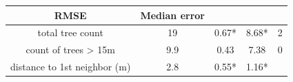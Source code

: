 \documentclass[twoside,12pt,final]{ucthesis-CA2012}
\begin{document}
\begin{ucmainmatter}
\begin{longtable}[]{@{}ccccc@{}}
\begin{minipage}[b]{0.08\columnwidth}
RMSE\strut
\end{minipage} & \begin{minipage}[b]{0.13\columnwidth}\centering\strut
Median error\strut
\end{minipage}\tabularnewline
\midrule
\endhead
\begin{minipage}[t]{0.28\columnwidth}\centering\strut
total tree count\strut
\end{minipage} & \begin{minipage}[t]{0.13\columnwidth}\centering\strut
19\strut
\end{minipage} & \begin{minipage}[t]{0.24\columnwidth}\centering\strut
0.67*\strut
\end{minipage} & \begin{minipage}[t]{0.08\columnwidth}\centering\strut
8.68*\strut
\end{minipage} & \begin{minipage}[t]{0.13\columnwidth}\centering\strut
2\strut
\end{minipage}\tabularnewline
\begin{minipage}[t]{0.28\columnwidth}\centering\strut
count of trees \textgreater{} 15m\strut
\end{minipage} & \begin{minipage}[t]{0.13\columnwidth}\centering\strut
9.9\strut
\end{minipage} & \begin{minipage}[t]{0.24\columnwidth}\centering\strut
0.43\strut
\end{minipage} & \begin{minipage}[t]{0.08\columnwidth}\centering\strut
7.38\strut
\end{minipage} & \begin{minipage}[t]{0.13\columnwidth}\centering\strut
0\strut
\end{minipage}\tabularnewline
\begin{minipage}[t]{0.28\columnwidth}\centering\strut
distance to 1st neighbor (m)\strut
\end{minipage} & \begin{minipage}[t]{0.13\columnwidth}\centering\strut
2.8\strut
\end{minipage} & \begin{minipage}[t]{0.24\columnwidth}\centering\strut
0.55*\strut
\end{minipage} & \begin{minipage}[t]{0.08\columnwidth}\centering\strut
1.16*\strut
\end{minipage} & \begin{minipage}[t]{0.13\columnwidth}\centering\strut

\end{minipage}
\end{longtable}
\end{ucmainmatter}
\end{document}
